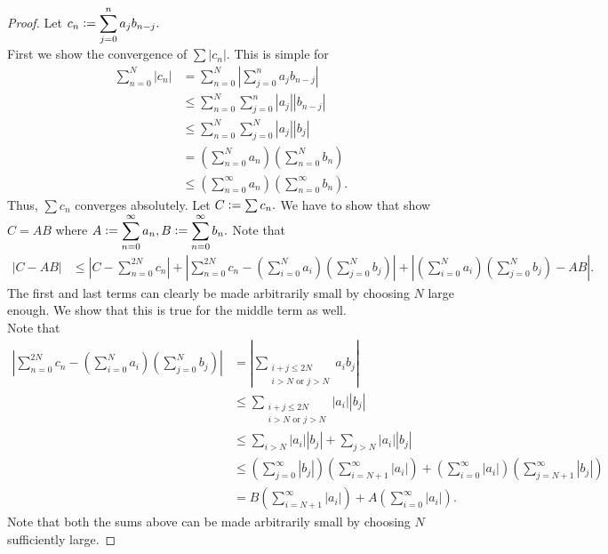 \cauchprodconv*\label{thm:cauchprodconv2}
\begin{flushright}\hyperref[thm:cauchprodconv]{\upsym}\end{flushright}
\begin{proof}
	Let $c_n \vcentcolon= \displaystyle\sum_{j=0}^{n}a_jb_{n-j}.$\\
	First we show the convergence of $\sum \left|c_n\right|.$ This is simple for
	\begin{align*} 
		\sum_{n=0}^{N}|c_n| &= \sum_{n=0}^{N}\left|\sum_{j=0}^{n}a_jb_{n-j}\right|\\
		&\le \sum_{n=0}^{N}\sum_{j=0}^{n}|a_j||b_{n-j}|\\
		&\le \sum_{n=0}^{N}\sum_{j=0}^{N}|a_j||b_{j}|\\
		&= \left(\displaystyle\sum_{n=0}^{N}a_n\right)\left(\displaystyle\sum_{n=0}^{N}b_n\right)\\
		&\le \left(\displaystyle\sum_{n=0}^{\infty}a_n\right)\left(\displaystyle\sum_{n=0}^{\infty}b_n\right).
	\end{align*}
	Thus, $\sum c_n$ converges absolutely. Let $C \vcentcolon= \sum c_n.$ We have to show that show $C = AB$ where $A \vcentcolon= \displaystyle\sum_{n=0}^{\infty}a_n, B \vcentcolon= \displaystyle\sum_{n=0}^{\infty}b_n.$
	Note that 
	\begin{align*} 
		|C - AB| &\le \left|C - \sum_{n=0}^{2N}c_n\right| + \left|\sum_{n=0}^{2N}c_n - \left(\sum_{i=0}^{N}a_i\right)\left(\sum_{j=0}^{N}b_j\right)\right| + \left|\left(\sum_{i=0}^{N}a_i\right)\left(\sum_{j=0}^{N}b_j\right) - AB\right|.
	\end{align*}
	The first and last terms can clearly be made arbitrarily small by choosing $N$ large enough. We show that this is true for the middle term as well.\\
	Note that
	\begin{align*} 
		\left|\sum_{n=0}^{2N}c_n - \left(\sum_{i=0}^{N}a_i\right)\left(\sum_{j=0}^{N}b_j\right)\right| &= \left|\sum_{\substack{i + j \le 2N\\ i > N \text{ or } j > N}}a_ib_j\right|\\
		&\le \sum_{\substack{i + j \le 2N\\ i > N \text{ or } j > N}}|a_i||b_j|\\
		&\le \sum_{i>N}|a_i||b_j| + \sum_{j>N}|a_i||b_j|\\
		&\le \left(\sum_{j=0}^{\infty}|b_j|\right)\left(\sum_{i=N+1}^{\infty}|a_i|\right) + \left(\sum_{i=0}^{\infty}|a_i|\right)\left(\sum_{j=N+1}^{\infty}|b_j|\right)\\
		&= B\left(\sum_{i=N+1}^{\infty}|a_i|\right) + A\left(\sum_{i=0}^{\infty}|a_i|\right).
	\end{align*}
	Note that both the sums above can be made arbitrarily small by choosing $N$ sufficiently large.
\end{proof}

